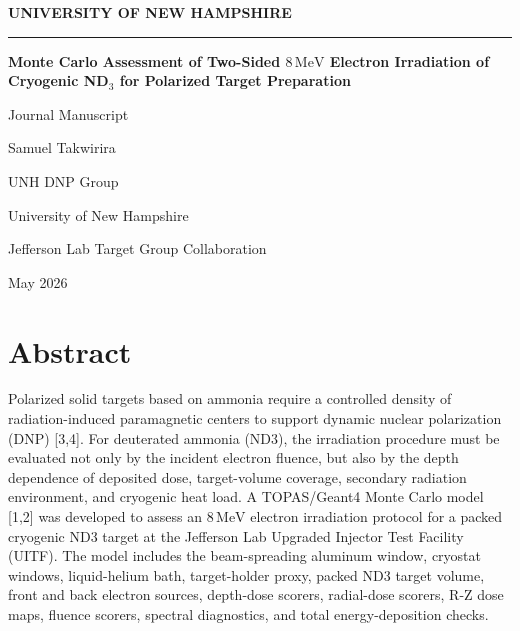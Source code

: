 \documentclass[
  12pt,
]{article}
\author{}
\date{}
\begin{document}
\begin{titlepage}
\centering
\vspace*{0.85in}
{\Large\bfseries UNIVERSITY OF NEW HAMPSHIRE\par}
\vspace{0.35in}
\rule{0.58\textwidth}{0.4pt}\par
\vspace{0.85in}
{\LARGE\bfseries Monte Carlo Assessment of Two-Sided $8\,\mathrm{MeV}$ Electron Irradiation of Cryogenic ND$_3$ for Polarized Target Preparation\par}
\vspace{0.55in}
{\large Journal Manuscript\par}
\vspace{0.55in}
{\large Samuel Takwirira\par}
\vspace{0.25in}
{UNH DNP Group\par}
{University of New Hampshire\par}
{Jefferson Lab Target Group Collaboration\par}
\vfill
{May 2026\par}
\end{titlepage}

\hypertarget{abstract}{%
\section{Abstract}\label{abstract}}

Polarized solid targets based on ammonia require a controlled density of
radiation-induced paramagnetic centers to support dynamic nuclear
polarization (DNP) {[}3,4{]}. For deuterated ammonia (ND3), the
irradiation procedure must be evaluated not only by the incident
electron fluence, but also by the depth dependence of deposited dose,
target-volume coverage, secondary radiation environment, and cryogenic
heat load. A TOPAS/Geant4 Monte Carlo model {[}1,2{]} was developed to
assess an \(8\,\mathrm{MeV}\) electron irradiation protocol for a packed
cryogenic ND3 target at the Jefferson Lab Upgraded Injector Test
Facility (UITF). The model includes the beam-spreading aluminum window,
cryostat windows, liquid-helium bath, target-holder proxy, packed ND3
target volume, front and back electron sources, depth-dose scorers,
radial-dose scorers, R-Z dose maps, fluence scorers, spectral
diagnostics, and total energy-deposition checks.
\end{document}

